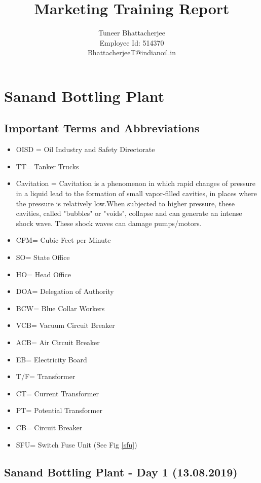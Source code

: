 \documentclass{report}
\title{Marketing Training Report}
\author{Tuneer Bhattacherjee\\Employee Id: 514370\\BhattacherjeeT@indianoil.in}
\begin{document}
	\maketitle
	\pagebreak
	\tableofcontents
	\pagebreak
	\chapter{Sanand Bottling Plant}
	\section{Important Terms and Abbreviations}
	\begin{itemize}
		\item OISD = Oil Industry and Safety Directorate
		\item TT= Tanker Trucks
		\item Cavitation = Cavitation is a phenomenon in which rapid changes of pressure in a liquid lead to the formation of small vapor-filled cavities, in places where the pressure is relatively low.When subjected to higher pressure, these cavities, called "bubbles" or "voids", collapse and can generate an intense shock wave. These shock waves can damage pumps/motors.
		\item CFM= Cubic Feet per Minute
		\item SO= State Office
		\item HO= Head Office
		\item DOA= Delegation of Authority
		\item BCW= Blue Collar Workers
		\item VCB= Vacuum Circuit Breaker
		\item ACB= Air Circuit Breaker
		\item EB= Electricity Board
		\item T/F= Transformer
		\item CT= Current Transformer
		\item PT= Potential Transformer
		\item CB= Circuit Breaker
		\item SFU= Switch Fuse Unit (See Fig \ref{sfu})
	\end{itemize}
	\section{Sanand Bottling Plant - Day 1 (13.08.2019)}
	
\end{document}
